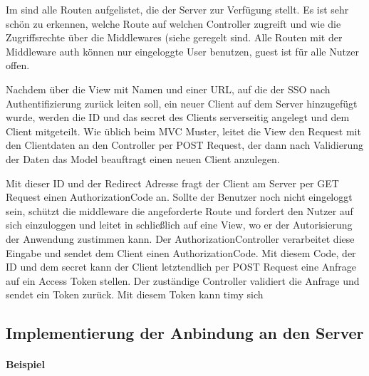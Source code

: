 Im  sind alle Routen aufgelistet, die der Server zur Verfügung stellt. Es ist sehr schön zu erkennen, welche Route auf welchen Controller zugreift und wie die Zugriffsrechte über die Middlewares (siehe  geregelt sind. Alle Routen mit der Middleware auth können nur eingeloggte User benutzen, guest ist für alle Nutzer offen.

Nachdem über die View mit Namen und einer URL, auf die der SSO nach Authentifizierung zurück leiten soll, ein neuer Client auf dem Server hinzugefügt wurde, werden die ID und das secret des Clients serverseitig angelegt und dem Client mitgeteilt. Wie üblich beim MVC Muster, leitet die View den Request mit den Clientdaten an den Controller per POST Request, der dann nach Validierung der Daten das Model beauftragt einen neuen Client anzulegen. 

Mit dieser ID und der Redirect Adresse fragt der Client am Server per GET Request einen AuthorizationCode an. Sollte der Benutzer noch nicht eingeloggt sein, schützt die middleware die angeforderte Route und fordert den Nutzer auf sich einzuloggen und leitet in schließlich auf eine View, wo er der Autorisierung der Anwendung zustimmen kann. Der AuthorizationController verarbeitet diese Eingabe und sendet dem Client einen AuthorizationCode. Mit diesem Code, der ID und dem secret kann der Client letztendlich per POST Request eine Anfrage auf ein Access Token stellen. Der zuständige Controller validiert die Anfrage und sendet ein Token zurück. Mit diesem Token kann timy sich 




\subsection{Implementierung der Anbindung an den Server}
\label{sec:ImplementierungCient}


\paragraph{Beispiel}


